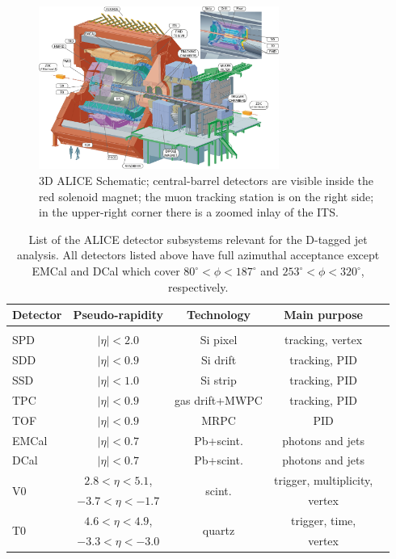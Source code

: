 \documentclass[12pt, a4paper, twoside, titlepage]{article}
\begin{document}
\begin{figure}[tb]
\begin{center}
\includegraphics[width=0.7\textwidth]{img/alice}
 \caption{3D ALICE Schematic; central-barrel detectors are visible inside the red solenoid magnet;
 the muon tracking station is on the right side; in the upper-right corner there is a zoomed inlay of the ITS.} 
 \label{fig:alice}
\end{center}
\end{figure}

\begin{table}[bt]
\centering
\begin{tabular}{lcccc}
Detector		& Pseudo-rapidity		& Technology			& Main purpose			\\
\hline 
\hline
\\
SPD			& $\lvert \eta\rvert <2.0$	& Si pixel				& tracking, vertex		\\
SDD			& $\lvert \eta\rvert <0.9$ 	& Si drift				& tracking, PID			\\
SSD			& $\lvert \eta\rvert <1.0$ 	& Si strip				& tracking, PID			\\
TPC 			& $\lvert \eta\rvert <0.9$ 	& gas drift+MWPC		& tracking, PID			\\
TOF			& $\lvert \eta\rvert <0.9$	& MRPC				& PID				\\
EMCal		& $\lvert \eta\rvert <0.7$ 	& Pb+scint. 			& photons and jets		\\
DCal			& $\lvert \eta\rvert <0.7$ 	& Pb+scint. 			& photons and jets		\\
\multirow{2}{*}{V0}& $2.8 <\eta< 5.1$,	&\multirow{2}{*}{scint.}	& trigger, multiplicity,		\\
			& $-3.7 <\eta<-1.7$		&					& vertex				\\
\multirow{2}{*}{T0}& $4.6 <\eta< 4.9$,	&\multirow{2}{*}{quartz}	& trigger, time,			\\
			& $-3.3 <\eta<-3.0$		&					& vertex				\\
\end{tabular}
\caption{List of the ALICE detector subsystems relevant for the D-tagged jet analysis. All detectors listed above have full azimuthal acceptance except EMCal and DCal 
which cover $80^{\circ} <\phi< 187^{\circ}$ and $253^{\circ} <\phi< 320^{\circ}$, respectively.
\label{tab:ALICEdetectors}}
\end{table}
\end{document}
